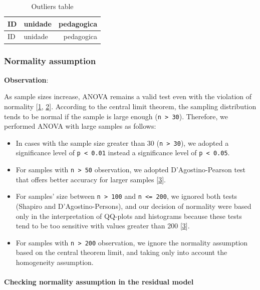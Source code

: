 \documentclass[]{article}
\let\oldparagraph\paragraph
\renewcommand{\paragraph}[1]{\oldparagraph{#1}\mbox{}}
\begin{document}
\begin{longtable}[]{@{}llr@{}}
\caption{Outliers table}\tabularnewline
\toprule
ID & unidade & pedagogica\tabularnewline
\midrule
\endfirsthead
\toprule
ID & unidade & pedagogica\tabularnewline
\midrule
\endhead
\bottomrule
\end{longtable}

\hypertarget{normality-assumption}{%
\subsubsection{Normality assumption}\label{normality-assumption}}

\textbf{Observation}:

As sample sizes increase, ANOVA remains a valid test even with the
violation of normality {[}\protect\hyperlink{references}{1},
\protect\hyperlink{references}{2}{]}. According to the central limit
theorem, the sampling distribution tends to be normal if the sample is
large enough (\texttt{n\ \textgreater{}\ 30}). Therefore, we performed
ANOVA with large samples as follows:

\begin{itemize}
\item
  In cases with the sample size greater than 30
  (\texttt{n\ \textgreater{}\ 30}), we adopted a significance level of
  \texttt{p\ \textless{}\ 0.01} instead a significance level of
  \texttt{p\ \textless{}\ 0.05}.
\item
  For samples with \texttt{n\ \textgreater{}\ 50} observation, we
  adopted D'Agostino-Pearson test that offers better accuracy for larger
  samples {[}\protect\hyperlink{references}{3}{]}.
\item
  For samples' size between \texttt{n\ \textgreater{}\ 100} and
  \texttt{n\ \textless{}=\ 200}, we ignored both tests (Shapiro and
  D'Agostino-Persons), and our decision of normality were based only in
  the interpretation of QQ-plots and histograms because these tests tend
  to be too sensitive with values greater than 200
  {[}\protect\hyperlink{references}{3}{]}.
\item
  For samples with \texttt{n\ \textgreater{}\ 200} observation, we
  ignore the normality assumption based on the central theorem limit,
  and taking only into account the homogeneity assumption.
\end{itemize}

\hypertarget{checking-normality-assumption-in-the-residual-model}{%
\paragraph{Checking normality assumption in the residual
model}\label{checking-normality-assumption-in-the-residual-model}}
\end{document}
